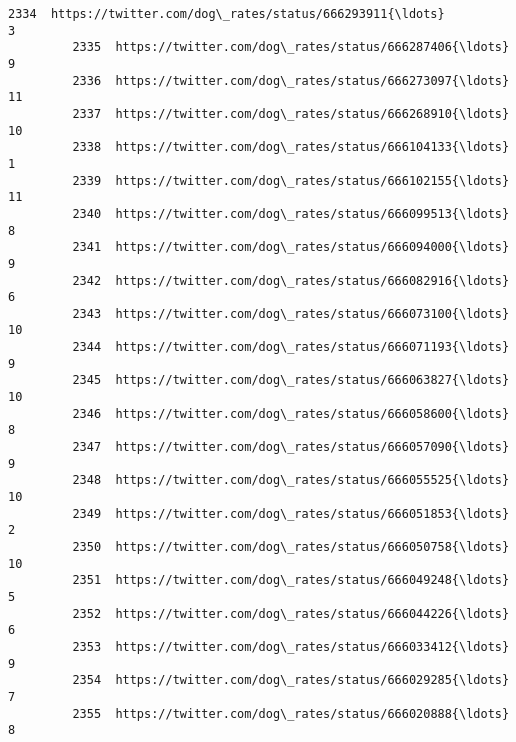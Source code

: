 \documentclass[11pt]{article}
\begin{document}
\begin{Verbatim}[commandchars=\\\{\}]
         2334  https://twitter.com/dog\_rates/status/666293911{\ldots}                 3   
         2335  https://twitter.com/dog\_rates/status/666287406{\ldots}                 9   
         2336  https://twitter.com/dog\_rates/status/666273097{\ldots}                11   
         2337  https://twitter.com/dog\_rates/status/666268910{\ldots}                10   
         2338  https://twitter.com/dog\_rates/status/666104133{\ldots}                 1   
         2339  https://twitter.com/dog\_rates/status/666102155{\ldots}                11   
         2340  https://twitter.com/dog\_rates/status/666099513{\ldots}                 8   
         2341  https://twitter.com/dog\_rates/status/666094000{\ldots}                 9   
         2342  https://twitter.com/dog\_rates/status/666082916{\ldots}                 6   
         2343  https://twitter.com/dog\_rates/status/666073100{\ldots}                10   
         2344  https://twitter.com/dog\_rates/status/666071193{\ldots}                 9   
         2345  https://twitter.com/dog\_rates/status/666063827{\ldots}                10   
         2346  https://twitter.com/dog\_rates/status/666058600{\ldots}                 8   
         2347  https://twitter.com/dog\_rates/status/666057090{\ldots}                 9   
         2348  https://twitter.com/dog\_rates/status/666055525{\ldots}                10   
         2349  https://twitter.com/dog\_rates/status/666051853{\ldots}                 2   
         2350  https://twitter.com/dog\_rates/status/666050758{\ldots}                10   
         2351  https://twitter.com/dog\_rates/status/666049248{\ldots}                 5   
         2352  https://twitter.com/dog\_rates/status/666044226{\ldots}                 6   
         2353  https://twitter.com/dog\_rates/status/666033412{\ldots}                 9   
         2354  https://twitter.com/dog\_rates/status/666029285{\ldots}                 7   
         2355  https://twitter.com/dog\_rates/status/666020888{\ldots}                 8   
         

\end{Verbatim}
\end{document}
